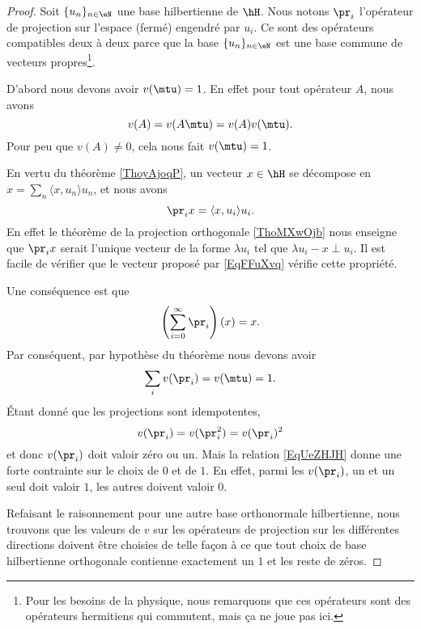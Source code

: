 \begin{proof}
    Soit \( \{ u_n \}_{n\in \eN}\) une base hilbertienne de \( \hH\). Nous notons \( \pr_i\) l'opérateur de projection sur l'espace (fermé) engendré par \( u_i\). Ce sont des opérateurs compatibles deux à deux parce que la base \( \{ u_n \}_{n\in \eN}\) est une base commune de vecteurs propres\footnote{Pour les besoins de la physique, nous remarquons que ces opérateurs sont des opérateurs hermitiens qui commutent, mais ça ne joue pas ici.}.

    D'abord nous devons avoir \( v(\mtu)=1\). En effet pour tout opérateur \( A\), nous avons
    \begin{equation}
        v(A)=v(A\mtu)=v(A)v(\mtu).
    \end{equation}
    Pour peu que \( v(A)\neq 0\), cela nous fait \( v(\mtu)=1\).

    En vertu du théorème \ref{ThoyAjoqP}, un vecteur \( x\in\hH\) se décompose en \( x=\sum_n\langle x, u_n\rangle u_n\), et nous avons
    \begin{equation}    \label{EqFFuXvq}
        \pr_ix=\langle x, u_i\rangle u_i.
    \end{equation}
    En effet le théorème de la projection orthogonale \ref{ThoMXwOjb} nous enseigne que \( \pr_ix\) serait l'unique vecteur de la forme \( \lambda u_i\) tel que \( \lambda u_i-x\perp u_i\). Il est facile de vérifier que le vecteur proposé par \eqref{EqFFuXvq} vérifie cette propriété.

    Une conséquence est que
    \begin{equation}
        \left( \sum_{i=0}^{\infty}\pr_i \right)(x)=x.
    \end{equation}
    Par conséquent, par hypothèse du théorème nous devons avoir
    \begin{equation}    \label{EqUeZHJH}
        \sum_iv(\pr_i)=v(\mtu)=1.
    \end{equation}
    Étant donné que les projections sont idempotentes,
    \begin{equation}
        v(\pr_i)=v(\pr_i^2)=v(\pr_i)^2
    \end{equation}
    et donc \( v(\pr_i)\) doit valoir zéro ou un. Mais la relation \eqref{EqUeZHJH} donne une forte contrainte sur le choix de \( 0\) et de \( 1\). En effet, parmi les \( v(\pr_i)\), un et un seul doit valoir \( 1\), les autres doivent valoir \( 0\).

    Refaisant le raisonnement pour une autre base orthonormale hilbertienne, nous trouvons que les valeurs de \( v\) sur les opérateurs de projection sur les différentes directions doivent être choisies de telle façon à ce que tout choix de base hilbertienne orthogonale contienne exactement un \( 1\) et les reste de zéros.


\end{proof}
